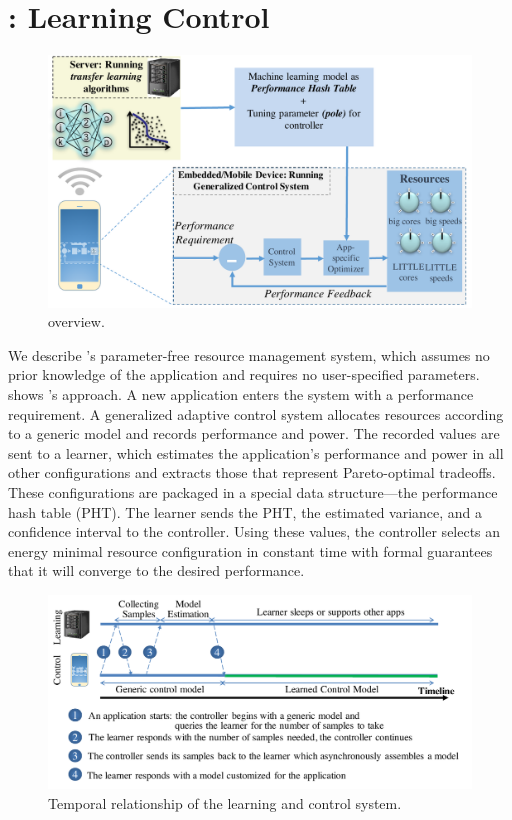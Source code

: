 \section{\SYSTEM{}: Learning Control}
\label{sec:framework}

\begin{figure}
  \includegraphics[width=\columnwidth]{figures/Overview.pdf}
  \caption{\SYSTEM{} overview.}
  \label{fig:overview}
\end{figure}


We describe \SYSTEM{}'s parameter-free resource management system,
which assumes no prior knowledge of the application and requires no
user-specified parameters.   shows \SYSTEM{}'s
approach.  A new application enters the system with a performance
requirement.  A generalized adaptive control system allocates
resources according to a generic model and records performance and
power.  The recorded values are sent to a learner, which estimates the
application's performance and power in all other configurations and
extracts those that represent Pareto-optimal tradeoffs.  These
configurations are packaged in a special data structure---the
performance hash table (PHT).  The learner sends the PHT, the
estimated variance, and a confidence interval to the controller.
Using these values, the controller selects an energy minimal resource
configuration in constant time with formal guarantees that it will
converge to the desired performance.

\begin{figure}
  \includegraphics[width=\columnwidth]{figures/Timeline.pdf}
  \caption{Temporal relationship of the learning and control system.}
  \label{fig:timeline}
\end{figure}


